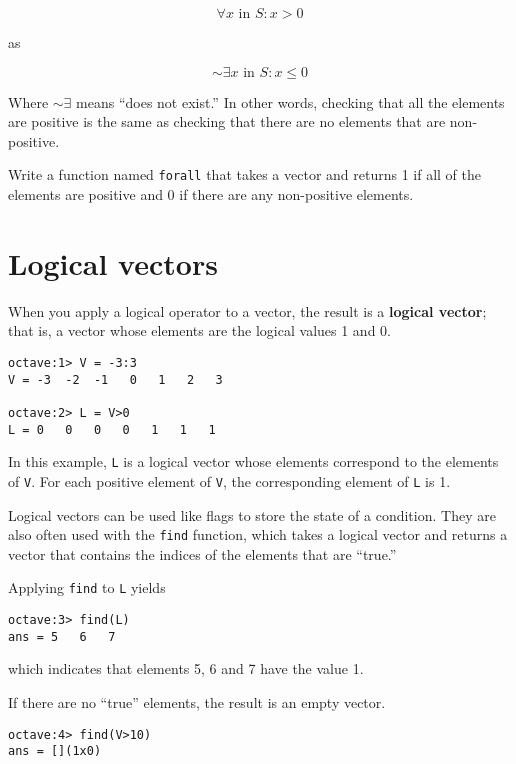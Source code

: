 \[ \forall x \mbox{~in~} S: x>0 \]

as

\[ \sim \exists x \mbox{~in~} S: x \le 0 \]

Where $\sim \exists$ means ``does not exist.''
In other words, checking that all the elements are positive is
the same as checking that there are no elements 
that are non-positive.

\begin{ex}
Write a function named {\tt forall} that
takes a vector and returns 1 if all of the elements are positive
and 0 if there are any non-positive elements.
\end{ex}




\section{Logical vectors}

When you apply a logical operator to a vector, the result is a {\bf
logical vector}; that is, a vector whose elements are the logical
values 1 and 0.

\begin{verbatim}
octave:1> V = -3:3
V = -3  -2  -1   0   1   2   3

octave:2> L = V>0
L = 0   0   0   0   1   1   1
\end{verbatim}

In this example, {\tt L} is a logical vector whose elements
correspond to the elements of {\tt V}. For each positive element of
{\tt V}, the corresponding element of {\tt L} is 1.

Logical vectors can be used like flags to store the state of
a condition. They are also often used with the {\tt find} function,
which takes a logical vector and returns a vector that contains
the indices of the elements that are ``true.''

Applying {\tt find} to {\tt L} yields

\begin{verbatim}
octave:3> find(L)
ans = 5   6   7
\end{verbatim}

which indicates that elements 5, 6 and 7 have the value 1.

If there are no ``true'' elements, the result is an empty vector.

\begin{verbatim}
octave:4> find(V>10)
ans = [](1x0)
\end{verbatim}

